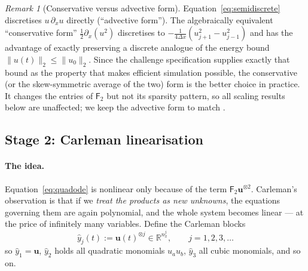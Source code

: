 \documentclass[11pt,a4paper]{article}
\theoremstyle{plain}
\theoremstyle{definition}
\theoremstyle{remark}
\newtheorem{remark}[proposition]{Remark}
\newcommand{\R}{\mathbb{R}}
\newcommand{\norm}[1]{\lVert #1 \rVert}
\newcommand{\uvec}{\bm{u}}
\newcommand{\Ftwo}{\mathsf{F}_2}
\begin{document}
\begin{remark}[Conservative versus advective form]
\label{rem:conservative}
Equation~\eqref{eq:semidiscrete} discretises $u\,\partial_xu$ directly
(``advective form'').  The algebraically equivalent ``conservative form''
$\tfrac12\partial_x(u^2)$ discretises to
$-\frac{1}{4\Delta x}(u_{j+1}^2-u_{j-1}^2)$ and has the advantage of exactly
preserving a discrete analogue of the energy bound $\norm{u(t)}_2\le\norm{u_0}_2$.
Since the challenge specification supplies exactly that bound as the property
that makes efficient simulation possible, the conservative (or the skew-symmetric
average of the two) form is the better choice in practice.  It changes the
entries of $\Ftwo$ but not its sparsity pattern, so all scaling results below are
unaffected; we keep the advective form to match \cite{Setty2026}.
\end{remark}

\subsection{Stage 2: Carleman linearisation}
\label{sec:carleman}

\paragraph{The idea.}  Equation~\eqref{eq:quadode} is nonlinear only because of
the term $\Ftwo\uvec^{\otimes2}$.  Carleman's observation is that if we
\emph{treat the products as new unknowns}, the equations governing them are
again polynomial, and the whole system becomes linear --- at the price of
infinitely many variables.  Define the Carleman blocks
\begin{equation}
\hat y_j(t) := \uvec(t)^{\otimes j}\in\R^{n_x^j},\qquad j=1,2,3,\dots
\end{equation}
so $\hat y_1=\uvec$, $\hat y_2$ holds all quadratic monomials $u_au_b$,
$\hat y_3$ all cubic monomials, and so on.
\end{document}
